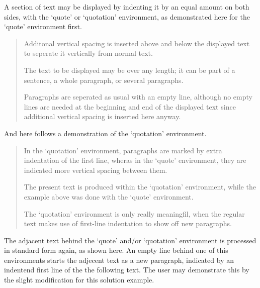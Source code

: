 \documentclass{article}
\begin{document}
A section of text may be displayed by indenting it by an equal amount
on both sides, with the `quote' or `quotation' environment, as 
demonstrated here for the `quote' environment first.
\begin{quote}
Additonal vertical spacing is inserted above and below the displayed
text to seperate it vertically from normal text.

The text to be displayed may be over any length; it can be part of a
sentence, a whole paragraph, or several paragraphs.

Paragraphs are seperated as usual with an empty line, although no
empty lines are needed at the beginning and end of the displayed
text since additional vertical spacing is inserted here anyway.
\end{quote}
And here follows a demonstration of the `quotation' environment.
\begin{quotation}
In the `quotation' environment, paragraphs are marked by extra indentation
of the first line, wheras in the `quote' environment, they are indicated
more vertical spacing between them.

The present text is produced within the `quotation' environment, while
the example above was done with the `quote' environment.

The `quotation' environment is only really meaningfil, when the regular
text makes use of first-line indentation to show off new paragraphs.
\end{quotation}
The adjacent text behind the `quote' and/or `quotation' environment is
processed in standard form again, as shown here. An empty line behind
one of this environments starts the adjecent text as a new paragraph,
indicated by an indentend first line of the the following text. The
user may demonstrate this by the slight modification for this solution
example.
\end{document}
